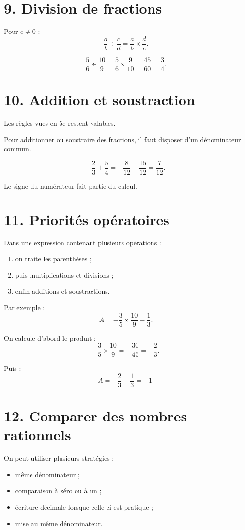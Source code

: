 \section{9. Division de fractions}

Pour $c\neq0$ :
\[
\boxed{
\dfrac ab\div\dfrac cd
=
\dfrac ab\times\dfrac dc
}.
\]

\begin{exemple}
\[
\dfrac56\div\dfrac{10}{9}
=
\dfrac56\times\dfrac9{10}
=
\dfrac{45}{60}
=
\dfrac34.
\]
\end{exemple}

\section{10. Addition et soustraction}

Les règles vues en 5e restent valables.

Pour additionner ou soustraire des fractions, il faut disposer d'un dénominateur commun.

\[
-\dfrac23+\dfrac54
=
-\dfrac8{12}+\dfrac{15}{12}
=
\dfrac7{12}.
\]

Le signe du numérateur fait partie du calcul.

\section{11. Priorités opératoires}

Dans une expression contenant plusieurs opérations :
\begin{enumerate}
\item on traite les parenthèses ;
\item puis multiplications et divisions ;
\item enfin additions et soustractions.
\end{enumerate}

Par exemple :
\[
A=-\dfrac35\times\dfrac{10}{9}-\dfrac13.
\]

On calcule d'abord le produit :
\[
-\dfrac35\times\dfrac{10}{9}
=
-\dfrac{30}{45}
=
-\dfrac23.
\]

Puis :
\[
A=-\dfrac23-\dfrac13=-1.
\]

\section{12. Comparer des nombres rationnels}

On peut utiliser plusieurs stratégies :
\begin{itemize}
\item même dénominateur ;
\item comparaison à zéro ou à un ;
\item écriture décimale lorsque celle-ci est pratique ;
\item mise au même dénominateur.
\end{itemize}


